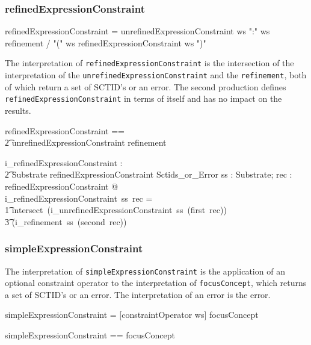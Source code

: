 \documentclass{article}
\def\spec#1{{\tt #1}}
\def\bnf#1{{\scriptsize {{#1}} }}
\begin{document}
\subsubsection{refinedExpressionConstraint}
\begin{framed}
\noindent
\bnf{refinedExpressionConstraint = unrefinedExpressionConstraint ws ":" ws refinement / "(" ws refinedExpressionConstraint ws ")"}
\end{framed}

The interpretation of \spec{refinedExpressionConstraint} is the intersection of the interpretation of
the \spec{unrefinedExpressionConstraint} and the \spec{refinement}, both of which return a set of SCTID's or
an error.  The second production defines \spec{refinedExpressionConstraint} in terms of itself and has no impact on the results.

\begin{zed}
refinedExpressionConstraint == \\
\t2 unrefinedExpressionConstraint \cross refinement \\
\end{zed}

\begin{gendef}
   i\_refinedExpressionConstraint : \\
\t2 Substrate \fun refinedExpressionConstraint \fun Sctids\_or\_Error
\where
   \forall ss : Substrate; rec : refinedExpressionConstraint @ \\
   i\_refinedExpressionConstraint~ss~rec = \\
\t1 intersect~(i\_unrefinedExpressionConstraint~ss~(first~rec)) \\
\t3 (i\_refinement~ss~(second~rec))
\end{gendef}


\subsubsection{simpleExpressionConstraint}
The interpretation of  \spec{simpleExpressionConstraint} is the application of an optional constraint 
operator to the interpretation of \spec{focusConcept}, which returns a set of SCTID's or an error.
The interpretation of an error is the error.


\begin{framed}
\noindent
\bnf{simpleExpressionConstraint =  [constraintOperator ws] focusConcept} \\
\end{framed}


\begin{zed}
simpleExpressionConstraint == \optional[constraintOperator] \cross focusConcept \\
\end{zed} 
\end{document}
